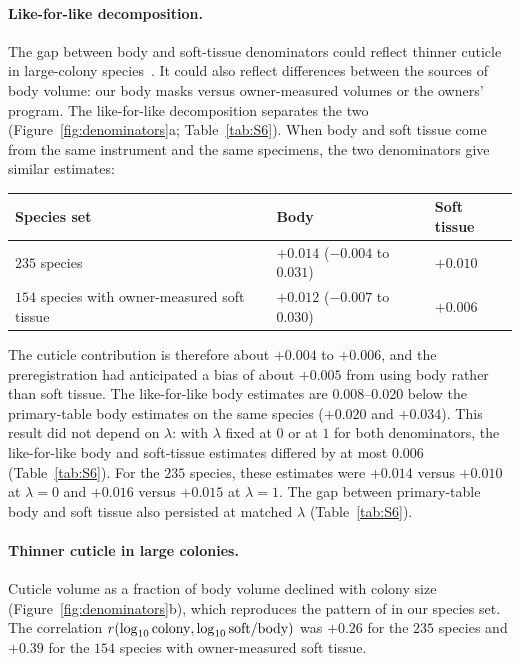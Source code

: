 \documentclass[11pt]{article}
\begin{document}
\paragraph{Like-for-like decomposition.} The gap between body and soft-tissue denominators could reflect thinner
cuticle in large-colony species~\citep{matte2025}. It could also reflect differences between the sources of body
volume: our body masks versus owner-measured volumes or the owners' program. The like-for-like decomposition separates
the two (Figure~\ref{fig:denominators}a; Table~\ref{tab:S6}). When body and soft tissue come from the same instrument
and the same specimens, the two denominators give similar estimates:
\begin{center}
\small
\begin{tabular}{@{}lll@{}}
\toprule
Species set & Body & Soft tissue \\
\midrule
$235$ species & $+0.014$ ($-0.004$ to $0.031$) & $+0.010$ \\
$154$ species with owner-measured soft tissue & $+0.012$ ($-0.007$ to $0.030$) & $+0.006$ \\
\bottomrule
\end{tabular}
\end{center}
The cuticle contribution is therefore about $+0.004$ to $+0.006$, and the preregistration had anticipated a bias of
about $+0.005$ from using body rather than soft tissue. The like-for-like body estimates are 0.008--0.020 below the
primary-table body estimates on the same species ($+0.020$ and $+0.034$). This result did not depend on $\lambda$: with
$\lambda$ fixed at $0$ or at $1$ for both denominators, the like-for-like body and soft-tissue estimates differed by at
most $0.006$ (Table~\ref{tab:S6}). For the $235$ species, these estimates were $+0.014$ versus $+0.010$ at
$\lambda = 0$ and $+0.016$ versus $+0.015$ at $\lambda = 1$. The gap between primary-table body and soft tissue also
persisted at matched $\lambda$ (Table~\ref{tab:S6}).

\paragraph{Thinner cuticle in large colonies.} Cuticle volume as a fraction of body volume declined with colony size
(Figure~\ref{fig:denominators}b), which reproduces the pattern of \citet{matte2025} in our species set. The correlation
$r(\log_{10}\text{colony}, \log_{10}\text{soft/body})$ was $+0.26$ for the $235$ species and $+0.39$ for the $154$ species
with owner-measured soft tissue.
\end{document}
